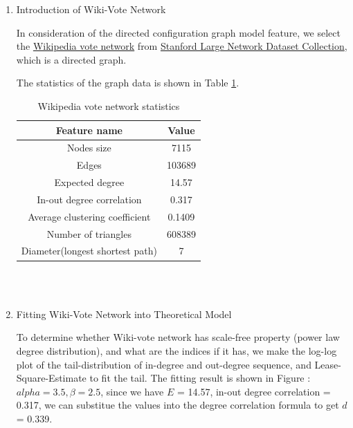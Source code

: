 \documentclass{article}
\begin{document}
\begin{enumerate}
\item Introduction of Wiki-Vote Network\\

\par In consideration of the directed configuration graph model feature, we select the \hyperlink{wikivote_intro}{Wikipedia vote network} from \href{https://snap.stanford.edu/data/}{Stanford Large Network Dataset Collection}, which is a directed graph. 
\par The statistics of the graph data is shown in Table \ref{wikivote_stats}.
\quad\\
\begin{table}[!hbp]
\centering
\caption{Wikipedia vote network statistics}\label{wikivote_stats}
\begin{tabular}{cc}

\toprule
Feature name & Value\\
\midrule
Nodes size & 7115\\
Edges & 103689\\
Expected degree & 14.57\\
In-out degree correlation & 0.317\\
Average clustering coefficient & 0.1409\\
Number of triangles & 608389\\
Diameter(longest shortest path) & 7\\

\bottomrule

\cline{1-2}
\hline
\end{tabular}
\end{table}
\\
\quad\\

\item Fitting Wiki-Vote Network into Theoretical Model\\

\par To determine whether Wiki-vote network has scale-free property (power law degree distribution), and what are the indices if it has, we make the log-log plot of the tail-distribution of in-degree and out-degree sequence, and Lease-Square-Estimate to fit the tail. \hypertarget{powerlaw_fit}{The fitting result} is shown in Figure  :$alpha =3.5, \beta = 2.5$,  since we have $E$ = 14.57, in-out degree correlation = 0.317, we can substitue the values into the degree correlation formula to get $d$ = 0.339. 



\end{enumerate}
\end{document}
